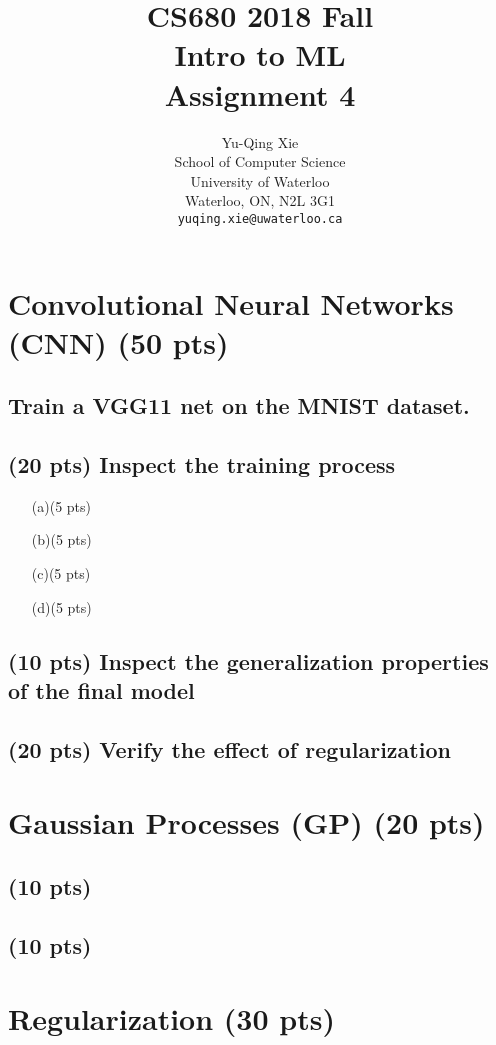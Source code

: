 \documentclass{article}
\title{CS680 2018 Fall\\Intro to ML\\Assignment 4}
\author{
	Yu-Qing Xie \\
	School of Computer Science\\
	University of Waterloo\\
	Waterloo, ON, N2L 3G1 \\
	\texttt{yuqing.xie@uwaterloo.ca} \\
}
\begin{document}
\maketitle
\section{Convolutional Neural Networks (CNN) (50 pts)}
\subsection{Train a VGG11 net on the MNIST dataset.}
\subsection{(20 pts) Inspect the training process}
\begin{itemize}
\item[(a)(5 pts)]
\item[(b)(5 pts)]
\item[(c)(5 pts)]
\item[(d)(5 pts)]
\end{itemize}
\subsection{(10 pts) Inspect the generalization properties of the final model}

\subsection{(20 pts) Verify the effect of regularization}

\section{Gaussian Processes (GP) (20 pts)}
\subsection{(10 pts)}
\subsection{(10 pts)}

\section{Regularization (30 pts)}
\end{document}
